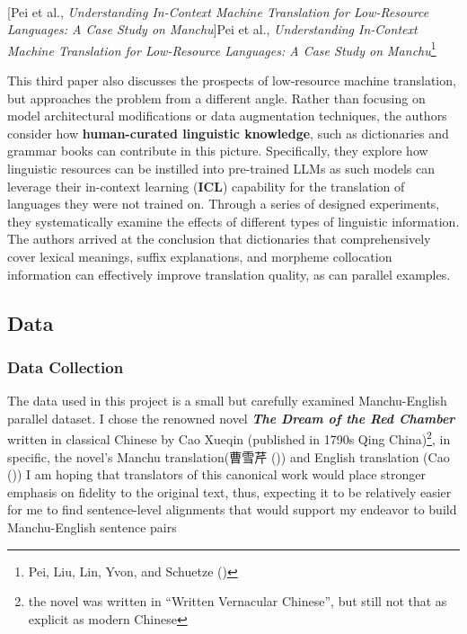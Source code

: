 \documentclass[
  letterpaper,
  DIV=11,
  numbers=noendperiod]{scrartcl}
\makeatletter
\let\oldparagraph\paragraph
\renewcommand{\paragraph}{
    \@ifstar
      \xxxParagraphStar
      \xxxParagraphNoStar
  }
\newcommand{\xxxParagraphStar}[1]{\oldparagraph*{#1}\mbox{}}
\newcommand{\xxxParagraphNoStar}[1]{\oldparagraph{#1}\mbox{}}
\makeatother
\begin{document}
\paragraph[Pei et al., \emph{Understanding In-Context Machine
Translation for Low-Resource Languages: A Case Study on
Manchu}]{\texorpdfstring{Pei et al., \emph{Understanding In-Context
Machine Translation for Low-Resource Languages: A Case Study on
Manchu}\footnote{Pei, Liu, Lin, Yvon, and Schuetze
  ()}}{Pei et al., Understanding In-Context Machine Translation for Low-Resource Languages: A Case Study on Manchu}}\label{pei-et-al.-understanding-in-context-machine-translation-for-low-resource-languages-a-case-study-on-manchu}

This third paper also discusses the prospects of low-resource machine
translation, but approaches the problem from a different angle. Rather
than focusing on model architectural modifications or data augmentation
techniques, the authors consider how \textbf{human-curated linguistic
knowledge}, such as dictionaries and grammar books can contribute in
this picture. Specifically, they explore how linguistic resources can be
instilled into pre-trained LLMs as such models can leverage their
in-context learning (\textbf{ICL}) capability for the translation of
languages they were not trained on. Through a series of designed
experiments, they systematically examine the effects of different types
of linguistic information. The authors arrived at the conclusion that
dictionaries that comprehensively cover lexical meanings, suffix
explanations, and morpheme collocation information can effectively
improve translation quality, as can parallel examples.

\subsection{Data}\label{data}

\subsubsection{Data Collection}\label{data-collection}

The data used in this project is a small but carefully examined
Manchu-English parallel dataset. I chose the renowned novel
\textbf{\emph{The Dream of the Red Chamber}} written in classical
Chinese by Cao Xueqin (published in 1790s Qing China)\footnote{the novel
  was written in ``Written Vernacular Chinese'', but still not that as
  explicit as modern Chinese}, in specific, the novel's Manchu
translation(曹雪芹
()) and English
translation (Cao ()) I am hoping
that translators of this canonical work would place stronger emphasis on
fidelity to the original text, thus, expecting it to be relatively
easier for me to find sentence-level alignments that would support my
endeavor to build Manchu-English sentence pairs
\end{document}
